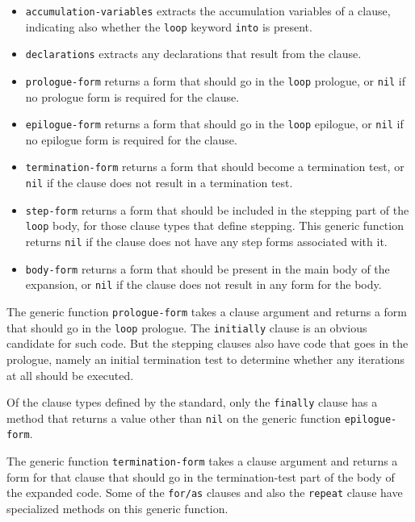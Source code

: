 \begin{itemize}
\item \texttt{accumulation-variables} extracts the accumulation
  variables of a clause, indicating also whether the \texttt{loop}
  keyword \texttt{into} is present.
\item \texttt{declarations} extracts any declarations that result from
  the clause.
\item \texttt{prologue-form} returns a form that should go in the
  \texttt{loop} prologue, or \texttt{nil} if no prologue form is
  required for the clause.
\item \texttt{epilogue-form} returns a form that should go in the
  \texttt{loop} epilogue, or \texttt{nil} if no epilogue form is
  required for the clause.
\item \texttt{termination-form} returns a form that should become a
  termination test, or \texttt{nil} if the clause does not result in a
  termination test.
\item \texttt{step-form} returns a form that should be included in the
  stepping part of the \texttt{loop} body, for those clause types that
  define stepping.  This generic function returns \texttt{nil} if the
  clause does not have any step forms associated with it.
\item \texttt{body-form} returns a form that should be present in the
  main body of the expansion, or \texttt{nil} if the clause does not
  result in any form for the body.
\end{itemize}

The generic function \texttt{prologue-form} takes a clause argument
and returns a form that should go in the \texttt{loop} prologue.  The
\texttt{initially} clause is an obvious candidate for such code.  But
the stepping clauses also have code that goes in the prologue, namely
an initial termination test to determine whether any iterations at all
should be executed.

Of the clause types defined by the \commonlisp{} standard, only the
\texttt{finally} clause has a method that returns a value other than
\texttt{nil} on the generic function \texttt{epilogue-form}.

The generic function \texttt{termination-form} takes a clause argument
and returns a form for that clause that should go in the
termination-test part of the body of the expanded code.  Some of the
\texttt{for/as} clauses and also the \texttt{repeat} clause have
specialized methods on this generic function.

